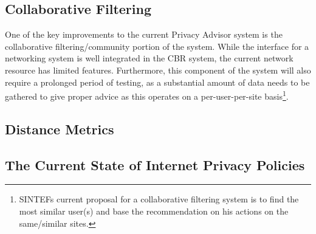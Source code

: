 \subsection{Collaborative Filtering} %
One of the key improvements to the current Privacy Advisor system is the
collaborative filtering/community portion of the system. While the interface
for a networking system is well integrated in the CBR system, the current 
network resource has limited features. Furthermore, this component of the system
will also require a prolonged period of testing, as a substantial amount of data
needs to be gathered to give proper advice as this operates on a per-user-per-site
basis\footnote{SINTEFs current proposal for a collaborative filtering system is
to find the most similar user(s) and base the recommendation on his actions on the
same/similar sites.}.

\subsection{Distance Metrics}


\subsection{The Current State of Internet Privacy Policies}
